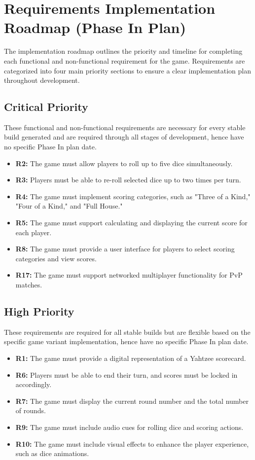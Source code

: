 \section{Requirements Implementation Roadmap (Phase In Plan)}

The implementation roadmap outlines the priority and timeline for completing each functional and non-functional requirement for the game. Requirements are categorized into four main priority sections to ensure a clear implementation plan throughout development.

\subsection{Critical Priority}
These functional and non-functional requirements are necessary for every stable build generated and are required through all stages of development, hence have no specific Phase In plan date.
\begin{itemize}
    \item \textbf{R2:} The game must allow players to roll up to five dice simultaneously.
    \item \textbf{R3:} Players must be able to re-roll selected dice up to two times per turn.
    \item \textbf{R4:} The game must implement scoring categories, such as "Three of a Kind," "Four of a Kind," and "Full House."
    \item \textbf{R5:} The game must support calculating and displaying the current score for each player.
    \item \textbf{R8:} The game must provide a user interface for players to select scoring categories and view scores.
    \item \textbf{R17:} The game must support networked multiplayer functionality for PvP matches.
\end{itemize}

\subsection{High Priority}
These requirements are required for all stable builds but are flexible based on the specific game variant implementation, hence have no specific Phase In plan date.
\begin{itemize}
    \item \textbf{R1:} The game must provide a digital representation of a Yahtzee scorecard.
    \item \textbf{R6:} Players must be able to end their turn, and scores must be locked in accordingly.
    \item \textbf{R7:} The game must display the current round number and the total number of rounds.
    \item \textbf{R9:} The game must include audio cues for rolling dice and scoring actions.
    \item \textbf{R10:} The game must include visual effects to enhance the player experience, such as dice animations.
\end{itemize}

